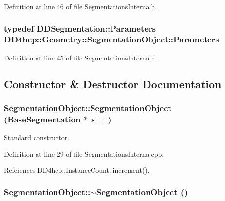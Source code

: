 Definition at line 46 of file SegmentationsInterna.h.\hypertarget{class_d_d4hep_1_1_geometry_1_1_segmentation_object_adb4bb039e0cd15ea9fbe0232d07c49cc}{
\subsubsection[{Parameters}]{\setlength{\rightskip}{0pt plus 5cm}typedef {\bf DDSegmentation::Parameters} {\bf DD4hep::Geometry::SegmentationObject::Parameters}}}
\label{class_d_d4hep_1_1_geometry_1_1_segmentation_object_adb4bb039e0cd15ea9fbe0232d07c49cc}


Definition at line 45 of file SegmentationsInterna.h.

\subsection{Constructor \& Destructor Documentation}
\hypertarget{class_d_d4hep_1_1_geometry_1_1_segmentation_object_a79ddebe4b3ce1664bac66bedff5dc096}{
\subsubsection[{SegmentationObject}]{\setlength{\rightskip}{0pt plus 5cm}SegmentationObject::SegmentationObject ({\bf BaseSegmentation} $\ast$ {\em s} = {})}}
\label{class_d_d4hep_1_1_geometry_1_1_segmentation_object_a79ddebe4b3ce1664bac66bedff5dc096}


Standard constructor. 

Definition at line 29 of file SegmentationsInterna.cpp.

References DD4hep::InstanceCount::increment().\hypertarget{class_d_d4hep_1_1_geometry_1_1_segmentation_object_ad2db3a9de2c3add55caf0c549cf93892}{
\subsubsection[{$\sim$SegmentationObject}]{\setlength{\rightskip}{0pt plus 5cm}SegmentationObject::$\sim$SegmentationObject ()}}
\label{class_d_d4hep_1_1_geometry_1_1_segmentation_object_ad2db3a9de2c3add55caf0c549cf93892}


